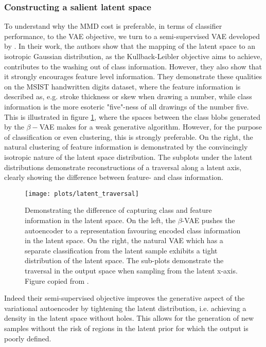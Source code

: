 \subsubsection{Constructing a salient latent space}

To understand why the MMD cost is preferable, in terms of classifier performance, to the VAE objective, we turn to a semi-supervised VAE developed by \citet{Antoran2019}. In their work, the authors show that the mapping of the latent space to an isotropic Gaussian distribution, as the Kullback-Leibler objective aims to achieve, contributes to the washing out of class information. However, they also show that it strongly encourages feature level information. They demonstrate these qualities on the MSIST handwritten digits dataset, where the feature information is described as, e.g. stroke thickness or skew when drawing a number, while class information is the more esoteric "five"-ness of all drawings of the number five. This is illustrated in figure \ref{fig:latent_traversal}, where the spaces between the class blobs generated by the $\beta-$VAE makes for a weak generative algorithm. However, for the purpose of classification or even clustering, this is strongly preferable. On the right, the natural clustering of feature information is demonstrated by the convincingly isotropic nature of the latent space distribution. The subplots under the latent distributions demonstrate reconstructions of a traversal along a latent axis, clearly showing the difference between feature- and class information. 

\begin{figure}
\centering
\texttt{[image: plots/latent\_traversal]}
\caption[Difference between generative and discriminative latent spaces]{Demonstrating the difference of capturing class and feature information in the latent space. On the left, the $\beta$-VAE pushes the autoencoder to a representation favouring encoded class information in the latent space. On the right, the natural VAE which has a separate classification from the latent sample exhibits a tight distribution of the latent space. The sub-plots demonstrate the traversal in the output space when sampling from the latent x-axis. Figure copied from \citet{Antoran2019}.}\label{fig:latent_traversal}
\end{figure}

Indeed their semi-supervised objective improves the generative aspect of the variational autoencoder by tightening the latent distribution, i.e. achieving a density in the latent space without holes. This allows for the generation of new samples without the risk of regions in the latent prior for which the output is poorly defined.

